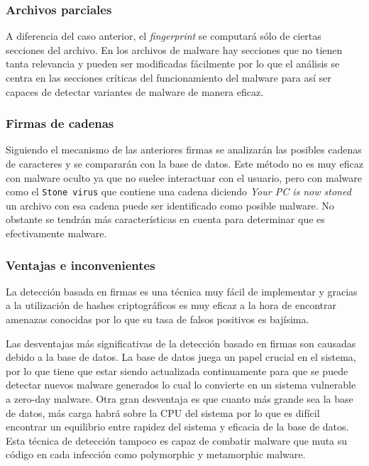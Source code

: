 \documentclass[12pt]{article}
\newcommand{\newpar} {
    \vskip 1cm
}
\begin{document}
            \subsubsection{Archivos parciales}
                A diferencia del caso anterior, el \textit{fingerprint} se computará sólo de ciertas secciones del archivo. En los archivos de malware hay secciones que no tienen tanta relevancia y pueden ser modificadas fácilmente por lo que el análisis se centra en las secciones críticas del funcionamiento del malware para así ser capaces de detectar variantes de malware de manera eficaz.

            \subsubsection{Firmas de cadenas}
                Siguiendo el mecanismo de las anteriores firmas se analizarán las posibles cadenas de caracteres y se compararán con la base de datos. Este método no es muy eficaz con malware oculto ya que no suelee interactuar con el usuario, pero con malware como el \texttt{Stone virus} que contiene una cadena diciendo \textit{Your PC is now stoned} un archivo con esa cadena puede ser identificado como posible malware. No obstante se tendrán más características en cuenta para determinar que es efectivamente malware.

            \subsubsection{Ventajas e inconvenientes}
                La detección basada en firmas es una técnica muy fácil de implementar y gracias a la utilización de hashes criptográficos es muy eficaz a la hora de encontrar amenazas conocidas por lo que su tasa de falsos positivos es bajísima.

                \newpar

                Las desventajas más significativas de la detección basado en firmas son causadas debido a la base de datos. La base de datos juega un papel crucial en el sistema, por lo que tiene que estar siendo actualizada continuamente para que se puede detectar nuevos malware generados lo cual lo convierte en un sistema vulnerable a zero-day malware. Otra gran desventaja es que cuanto más grande sea la base de datos, más carga habrá sobre la CPU del sistema por lo que es difícil encontrar un equilibrio entre rapidez del sistema y eficacia de la base de datos. Esta técnica de detección tampoco es capaz de combatir malware que muta su código en cada infección como polymorphic y metamorphic malware.
\end{document}
